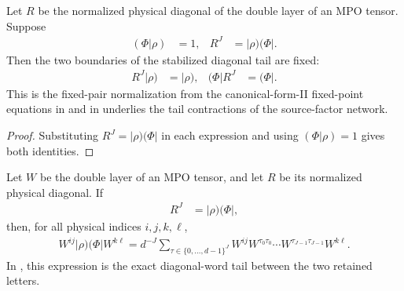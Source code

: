 \begin{lemma}
    \label{thm:mpu_normalized_diagonal_power_fixed_pair}
    \leanok
    Let $R$ be the normalized physical diagonal of the double layer of an MPO
    tensor.  Suppose
    \begin{align}
        (\Phi\rvert\rho) & =1,
                         & R^J & =\lvert\rho)(\Phi\rvert.
    \end{align}
    Then the two boundaries of the stabilized diagonal tail are fixed:
    \begin{align}
        R^J\lvert\rho) & =\lvert\rho),
                       & (\Phi\rvert R^J & =(\Phi\rvert.
    \end{align}
    This is the fixed-pair normalization from the canonical-form-II
    fixed-point equations in
    \cite[equations~(6a)--(6b)]{Cirac2017MPU} and in \cite[Theorem~III.8, Section~III.B, equations~(31)--(32)]{Cirac2017MPU} underlies the tail
    contractions
    of the source-factor network.
\end{lemma}

\begin{proof}\leanok
    Substituting $R^J=\lvert\rho)(\Phi\rvert$ in each expression and using
    $(\Phi\rvert\rho)=1$ gives both identities.
\end{proof}

\begin{lemma}
    \label{thm:mpu_rank_one_insertion_diagonal_tail}
    \leanok
    Let $W$ be the double layer of an MPO tensor, and let $R$ be its
    normalized physical diagonal.  If
    \begin{align}
        R^J & =\lvert\rho)(\Phi\rvert,
    \end{align}
    then, for all physical indices $i,j,k,\ell$,
    \begin{align}
        W^{ij}\lvert\rho)(\Phi\rvert W^{k\ell}
        =d^{-J}\sum_{\tau\in\{0,\ldots,d-1\}^J}
        W^{ij}W^{\tau_0\tau_0}\cdots
        W^{\tau_{J-1}\tau_{J-1}}W^{k\ell}.
    \end{align}
    In \cite[Theorem~III.8, Section~III.B, equations~(31)--(32)]{Cirac2017MPU}, this expression is the exact diagonal-word tail between the two retained
    letters.
\end{lemma}

